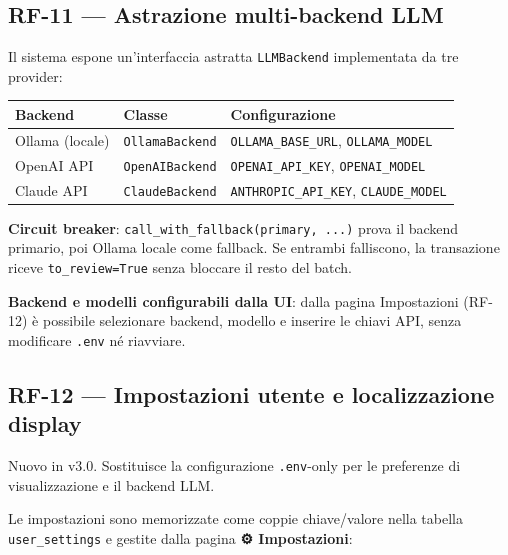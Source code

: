 \documentclass[11pt, a4paper]{article}
\begin{document}
\subsection{RF-11 --- Astrazione multi-backend LLM}
\label{sec:rf11}

Il sistema espone un'interfaccia astratta \texttt{LLMBackend} implementata da tre
provider:

\begin{center}
\begin{tabular}{@{}L{3.5cm} L{4cm} L{5.5cm}@{}}
\toprule
\textbf{Backend} & \textbf{Classe} & \textbf{Configurazione} \\
\midrule
Ollama (locale)  & \texttt{OllamaBackend}  & \texttt{OLLAMA\_BASE\_URL}, \texttt{OLLAMA\_MODEL} \\
OpenAI API       & \texttt{OpenAIBackend}  & \texttt{OPENAI\_API\_KEY}, \texttt{OPENAI\_MODEL} \\
Claude API       & \texttt{ClaudeBackend}  & \texttt{ANTHROPIC\_API\_KEY}, \texttt{CLAUDE\_MODEL} \\
\bottomrule
\end{tabular}
\end{center}

\textbf{Circuit breaker}: \texttt{call\_with\_fallback(primary, ...)} prova il backend
primario, poi Ollama locale come fallback. Se entrambi falliscono, la transazione
riceve \texttt{to\_review=True} senza bloccare il resto del batch.

\textbf{Backend e modelli configurabili dalla UI}: dalla pagina Impostazioni (RF-12)
è possibile selezionare backend, modello e inserire le chiavi API, senza modificare
\texttt{.env} né riavviare.

\subsection{RF-12 --- Impostazioni utente e localizzazione display}
\label{sec:rf12}

\begin{newbox}
Nuovo in v3.0. Sostituisce la configurazione \texttt{.env}-only per le preferenze
di visualizzazione e il backend LLM.
\end{newbox}

Le impostazioni sono memorizzate come coppie chiave/valore nella tabella
\texttt{user\_settings} e gestite dalla pagina \textbf{⚙️ Impostazioni}:
\end{document}
